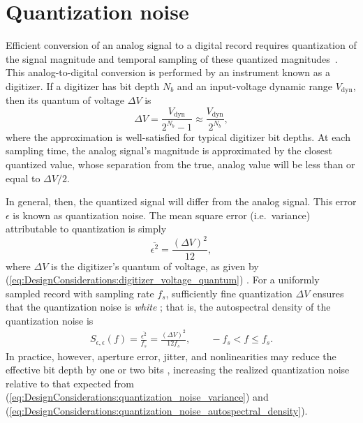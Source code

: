 \section{Quantization noise}
\label{sec:DesignConsiderations:quantization}
Efficient conversion of an analog signal to a digital record requires
quantization of the signal magnitude and
temporal sampling of these quantized magnitudes~\cite{bennett_bstj48}.
This analog-to-digital conversion
is performed by an instrument known as a digitizer.
If a digitizer has bit depth $N_b$ and
an input-voltage dynamic range $V_{\text{dyn}}$,
then its quantum of voltage $\Delta V$ is
\begin{equation}
  \Delta V
  =
  \frac{V_{\text{dyn}}}{2^{N_b} - 1}
  \approx
  \frac{V_{\text{dyn}}}{2^{N_b}},
  \label{eq:DesignConsiderations:digitizer_voltage_quantum}
\end{equation}
where the approximation is well-satisfied
for typical digitizer bit depths.
At each sampling time,
the analog signal's magnitude is approximated
by the closest quantized value, whose
separation from the true, analog value
will be less than or equal to $\Delta V / 2$.

In general, then, the quantized signal
will differ from the analog signal.
This error $\epsilon$ is known as quantization noise.
The mean square error (i.e.\ variance) attributable to quantization is simply
\begin{equation}
  \overline{\epsilon^2} = \frac{(\Delta V)^2}{12},
  \label{eq:DesignConsiderations:quantization_noise_variance}
\end{equation}
where $\Delta V$ is the digitizer's quantum of voltage,
as given by (\ref{eq:DesignConsiderations:digitizer_voltage_quantum})
\cite{bennett_bstj48}
\cite[Sec.~10.2.4]{bendat_and_piersol}.
For a uniformly sampled record with sampling rate $f_s$,
sufficiently fine quantization $\Delta V$
ensures that the quantization noise is \emph{white}
\cite[Th.~1]{bennett_bstj48}
\cite[Ch.~20]{widrow_and_kollar};
that is, the autospectral density of the quantization noise is
\begin{align}
  S_{\epsilon,\epsilon}(f)
  =
  \frac{\overline{\epsilon^2}}{f_s}
  =
  \frac{(\Delta V)^2}{12 f_s},
  \qquad
  -f_s < f \leq f_s.
  \label{eq:DesignConsiderations:quantization_noise_autospectral_density}
\end{align}
In practice, however, aperture error, jitter, and nonlinearities
may reduce the effective bit depth by one or two bits
\cite[Sec.~10.2.4]{bendat_and_piersol},
increasing the realized quantization noise
relative to that expected from
(\ref{eq:DesignConsiderations:quantization_noise_variance}) and
(\ref{eq:DesignConsiderations:quantization_noise_autospectral_density}).

